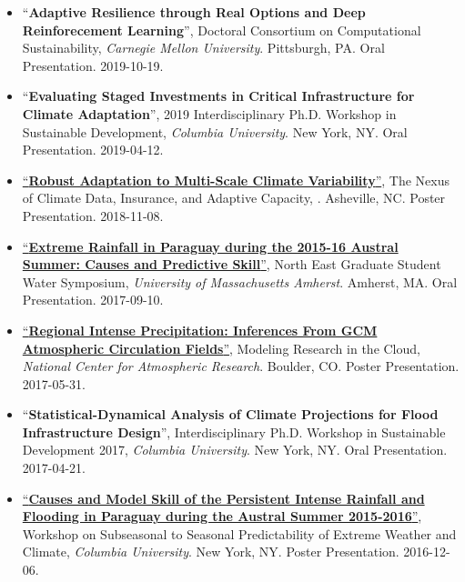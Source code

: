 \documentclass[10pt,oneside]{article}
\begin{document}
\begin{itemize}[label={}]
  \item \enquote{\textbf{Adaptive Resilience through Real Options and Deep Reinforecement Learning}}, Doctoral Consortium on Computational Sustainability,  \textit{Carnegie Mellon University}. Pittsburgh,  PA. Oral Presentation. 2019-10-19.
  
  \item \enquote{\textbf{Evaluating Staged Investments in Critical Infrastructure for Climate Adaptation}}, 2019 Interdisciplinary Ph.D. Workshop in Sustainable Development,  \textit{Columbia University}. New York, NY. Oral Presentation. 2019-04-12.
  
  \item \href{https://doi.org/10.6084/m9.figshare.8277002.v1}{\enquote{\textbf{Robust Adaptation to Multi-Scale Climate Variability}}}, The Nexus of Climate Data, Insurance, and Adaptive Capacity,  . Asheville, NC. Poster Presentation. 2018-11-08.
  
  \item \href{https://doi.org/10.6084/m9.figshare.8277128.v2}{\enquote{\textbf{Extreme Rainfall in Paraguay during the 2015-16 Austral Summer: Causes and Predictive Skill}}}, North East Graduate Student Water Symposium,  \textit{University of Massachusetts Amherst}. Amherst, MA. Oral Presentation. 2017-09-10.
  
  \item \href{https://doi.org/10.6084/m9.figshare.8277167.v1}{\enquote{\textbf{Regional Intense Precipitation: Inferences From GCM Atmospheric Circulation Fields}}}, Modeling Research in the Cloud,  \textit{National Center for Atmospheric Research}. Boulder, CO. Poster Presentation. 2017-05-31.
  
  \item \enquote{\textbf{Statistical-Dynamical Analysis of Climate Projections for Flood Infrastructure Design}}, Interdisciplinary Ph.D. Workshop in Sustainable Development 2017,  \textit{Columbia University}. New York, NY. Oral Presentation. 2017-04-21.
  
  \item \href{https://doi.org/10.13140/RG.2.2.20146.30406}{\enquote{\textbf{Causes and Model Skill of the Persistent Intense Rainfall and Flooding in Paraguay during the Austral Summer 2015-2016}}}, Workshop on Subseasonal to Seasonal Predictability of Extreme Weather and Climate,  \textit{Columbia University}. New York, NY. Poster Presentation. 2016-12-06.
  
\end{itemize}
\end{document}
